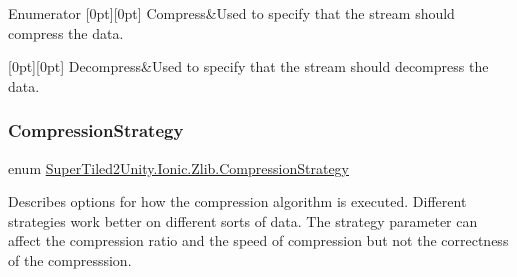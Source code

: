 \begin{DoxyEnumFields}{Enumerator}
[0pt][0pt]{}\mbox{\label{namespace_super_tiled2_unity_1_1_ionic_1_1_zlib_ad5b7635d92497e1c905e5de82eb1c6b1a8fa4fcfcda70410e089984d5f51ae97d}} 
Compress&Used to specify that the stream should compress the data. \\
\hline

[0pt][0pt]{}\mbox{\label{namespace_super_tiled2_unity_1_1_ionic_1_1_zlib_ad5b7635d92497e1c905e5de82eb1c6b1a6d2861192fdf4370bcf95c099be0f2f0}} 
Decompress&Used to specify that the stream should decompress the data. \\
\hline

\end{DoxyEnumFields}
\mbox{\label{namespace_super_tiled2_unity_1_1_ionic_1_1_zlib_abde5c10a1e2ee453e1e8e22e79a39a3b}} 
\subsubsection{\texorpdfstring{Compression\+Strategy}{CompressionStrategy}}
{\footnotesize\ttfamily enum \mbox{\hyperlink{namespace_super_tiled2_unity_1_1_ionic_1_1_zlib_abde5c10a1e2ee453e1e8e22e79a39a3b}{Super\+Tiled2\+Unity.\+Ionic.\+Zlib.\+Compression\+Strategy}}\hspace{0.3cm}{\ttfamily [strong]}}



Describes options for how the compression algorithm is executed. Different strategies work better on different sorts of data. The strategy parameter can affect the compression ratio and the speed of compression but not the correctness of the compresssion. 


